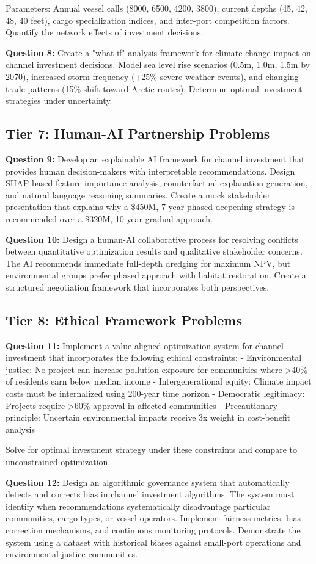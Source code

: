 \documentclass{article}
\begin{document}
Parameters: Annual vessel calls (8000, 6500, 4200, 3800), current depths (45, 42, 48, 40 feet), cargo specialization indices, and inter-port competition factors. Quantify the network effects of investment decisions.

\textbf{Question 8:} Create a "what-if" analysis framework for climate change impact on channel investment decisions. Model sea level rise scenarios (0.5m, 1.0m, 1.5m by 2070), increased storm frequency (+25\% severe weather events), and changing trade patterns (15\% shift toward Arctic routes). Determine optimal investment strategies under uncertainty.

\subsection{Tier 7: Human-AI Partnership Problems}

\textbf{Question 9:} Develop an explainable AI framework for channel investment that provides human decision-makers with interpretable recommendations. Design SHAP-based feature importance analysis, counterfactual explanation generation, and natural language reasoning summaries. Create a mock stakeholder presentation that explains why a \$450M, 7-year phased deepening strategy is recommended over a \$320M, 10-year gradual approach.

\textbf{Question 10:} Design a human-AI collaborative process for resolving conflicts between quantitative optimization results and qualitative stakeholder concerns. The AI recommends immediate full-depth dredging for maximum NPV, but environmental groups prefer phased approach with habitat restoration. Create a structured negotiation framework that incorporates both perspectives.

\subsection{Tier 8: Ethical Framework Problems}

\textbf{Question 11:} Implement a value-aligned optimization system for channel investment that incorporates the following ethical constraints:
- Environmental justice: No project can increase pollution exposure for communities where >40\% of residents earn below median income
- Intergenerational equity: Climate impact costs must be internalized using 200-year time horizon
- Democratic legitimacy: Projects require >60\% approval in affected communities
- Precautionary principle: Uncertain environmental impacts receive 3x weight in cost-benefit analysis

Solve for optimal investment strategy under these constraints and compare to unconstrained optimization.

\textbf{Question 12:} Design an algorithmic governance system that automatically detects and corrects bias in channel investment algorithms. The system must identify when recommendations systematically disadvantage particular communities, cargo types, or vessel operators. Implement fairness metrics, bias correction mechanisms, and continuous monitoring protocols. Demonstrate the system using a dataset with historical biases against small-port operations and environmental justice communities.
\end{document}
